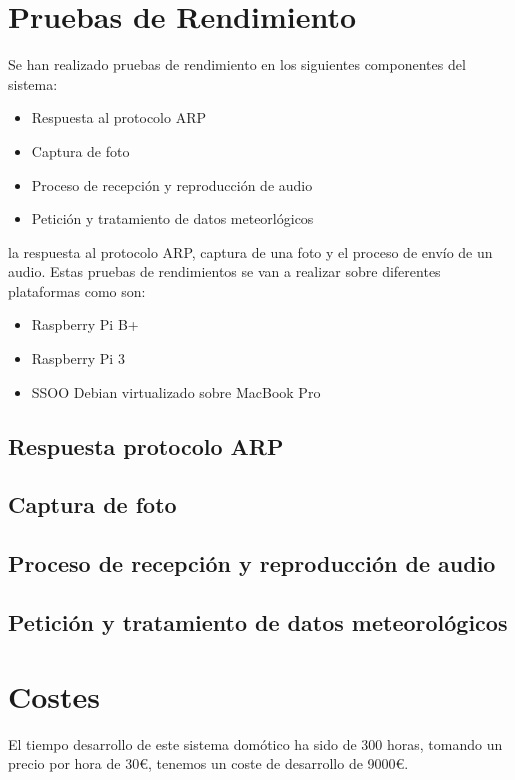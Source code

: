 \documentclass[10pt,journal,compsoc]{IEEEtran}
\begin{document}
\section{Pruebas de Rendimiento}
Se han realizado pruebas de rendimiento en los siguientes componentes del sistema:
\begin{itemize}
  \item Respuesta al protocolo ARP
  \item Captura de foto
  \item Proceso de recepción y reproducción de audio
  \item Petición y tratamiento de datos meteorlógicos
\end{itemize}
 la respuesta al protocolo ARP, captura de una foto y el proceso de envío de 
un audio. Estas pruebas de rendimientos se van a realizar sobre diferentes 
plataformas como son:
\begin{itemize}
\item Raspberry Pi B+
\item Raspberry Pi 3
\item SSOO Debian virtualizado sobre MacBook Pro
\end{itemize}

\subsection{Respuesta protocolo ARP}

\subsection{Captura de foto}

\subsection{Proceso de recepción y reproducción de audio}

\subsection{Petición y tratamiento de datos meteorológicos}


\section{Costes}
El tiempo desarrollo de este sistema domótico ha sido de 300 horas, tomando un 
precio por hora de 30\euro, tenemos un coste de desarrollo de 9000\euro.
\end{document}
